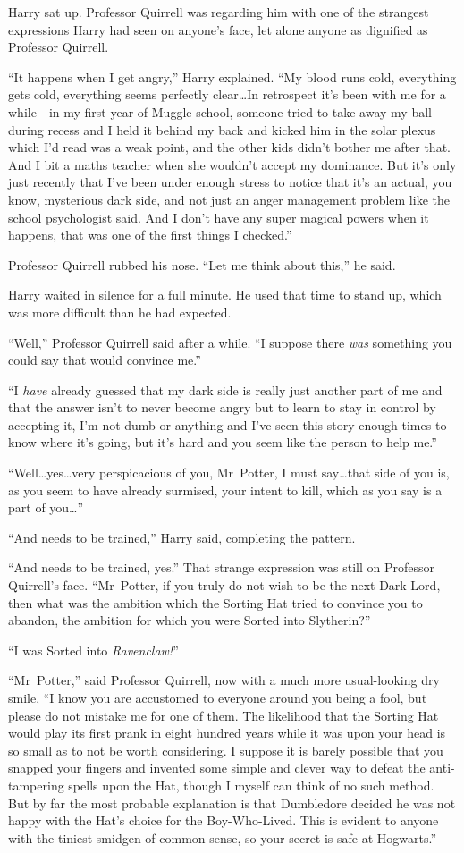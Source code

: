 Harry sat up. Professor Quirrell was regarding him with one of the strangest expressions Harry had seen on anyone’s face, let alone anyone as dignified as Professor Quirrell.

“It happens when I get angry,” Harry explained.
“My blood runs cold, everything gets cold, everything seems perfectly clear…In retrospect it’s been with me for a while—in my first year of Muggle school, someone tried to take away my ball during recess and I held it behind my back and kicked him in the solar plexus which I’d read was a weak point, and the other kids didn’t bother me after that. And I bit a maths teacher when she wouldn’t accept my dominance. But it’s only just recently that I’ve been under enough stress to notice that it’s an actual, you know, mysterious dark side, and not just an anger management problem like the school psychologist said. And I don’t have any super magical powers when it happens, that was one of the first things I checked.”

Professor Quirrell rubbed his nose.
“Let me think about this,” he said.

Harry waited in silence for a full minute. He used that time to stand up, which was more difficult than he had expected.

“Well,” Professor Quirrell said after a while.
“I suppose there \emph{was} something you could say that would convince me.”

“I \emph{have} already guessed that my dark side is really just another part of me and that the answer isn’t to never become angry but to learn to stay in control by accepting it, I’m not dumb or anything and I’ve seen this story enough times to know where it’s going, but it’s hard and you seem like the person to help me.”

“Well…yes…very perspicacious of you, Mr~Potter, I must say…that side of you is, as you seem to have already surmised, your intent to kill, which as you say is a part of you…”

“And needs to be trained,” Harry said, completing the pattern.

“And needs to be trained, yes.” That strange expression was still on Professor Quirrell’s face.
“Mr~Potter, if you truly do not wish to be the next Dark Lord, then what was the ambition which the Sorting Hat tried to convince you to abandon, the ambition for which you were Sorted into Slytherin?”

“I was Sorted into \emph{Ravenclaw!}”

“Mr~Potter,” said Professor Quirrell, now with a much more usual-looking dry smile,
“I know you are accustomed to everyone around you being a fool, but please do not mistake me for one of them. The likelihood that the Sorting Hat would play its first prank in eight hundred years while it was upon your head is so small as to not be worth considering. I suppose it is barely possible that you snapped your fingers and invented some simple and clever way to defeat the anti-tampering spells upon the Hat, though I myself can think of no such method. But by far the most probable explanation is that Dumbledore decided he was not happy with the Hat’s choice for the Boy-Who-Lived. This is evident to anyone with the tiniest smidgen of common sense, so your secret is safe at Hogwarts.”

